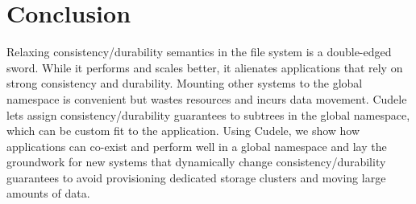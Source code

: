 %
%
%
%
%
%
%

\section{Conclusion}

Relaxing consistency/durability semantics in the file system is a double-edged
sword. While it performs and scales better, it alienates applications that rely
on strong consistency and durability. Mounting other systems to the global
namespace is convenient but wastes resources and incurs data movement.  Cudele
lets  assign
consistency/durability guarantees to subtrees in the global namespace, which
can be custom fit to the application. Using Cudele, we show how applications
can co-exist and perform well in a global namespace and lay the groundwork for
new systems that dynamically change consistency/durability guarantees to avoid
provisioning dedicated storage clusters and moving large amounts of data.




